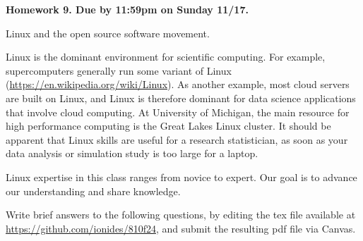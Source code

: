 \documentclass[12pt]{article}
\begin{document}
\begin{center}\bf
Homework 9. Due by 11:59pm on Sunday 11/17.

Linux and the open source software movement.

\end{center}

Linux is the dominant environment for scientific computing. For example, supercomputers generally run some variant of Linux (\url{https://en.wikipedia.org/wiki/Linux}). As another example, most cloud servers are built on Linux, and Linux is therefore dominant for data science applications that involve cloud computing. At University of Michigan, the main resource for high performance computing is the Great Lakes Linux cluster. It should be apparent that Linux skills are useful for a research statistician, as soon as your data analysis or simulation study is too large for a laptop.

Linux expertise in this class ranges from novice to expert. Our goal is to advance our understanding and share knowledge.

Write brief answers to the following questions, by editing the tex file available at \url{https://github.com/ionides/810f24}, and submit the resulting pdf file via Canvas.
\end{document}

